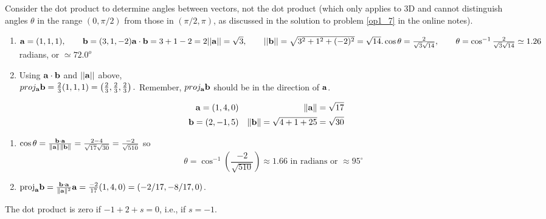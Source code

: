 \vspace{2mm}
Consider the dot product to determine angles between vectors, not the dot product (which only applies to 3D and cannot distinguish angles $\theta$ in the range $(0,\pi/2)$ from those in $(\pi/2,\pi)$, as discussed in the solution to problem \ref{op1_7} in the online notes).

\begin{enumerate}
\renewcommand{\labelenumi}{(\alph{enumi})}
\item $\aa = (1,1,1),\qquad \bb = (3,1,-2) \\ \aa\cdot\bb = 3+1-2 = 2\\
||\aa|| = \sqrt{3},\qquad ||\bb|| = \sqrt{3^2+1^2+(-2)^2}=\sqrt{14}.\\
\cos\theta = \frac{2}{\sqrt{3}\sqrt{14}},\qquad \theta = \cos^{-1}\frac{2}{\sqrt{3}\sqrt{14}}
\simeq 1.26 $ radians, or $\simeq 72.0^o$

\item Using $\aa\cdot\bb$ and $||\aa||$ above,\\
$proj_{\aa}\bb = \frac{2}{3}(1,1,1)=\left(\frac{2}{3},\frac{2}{3},\frac{2}{3}\right).$
Remember, $proj_{\aa}\bb$ should be in the direction of $\aa$.

\end{enumerate}

\vspace{2mm}
\begin{eqnarray*}
\aa = (1,4,0) & & \| \aa \| = \sqrt{17} \\
\bb = (2,-1,5) & & \| \bb \| = \sqrt{4 + 1 + 25} = \sqrt{30} 
\end{eqnarray*}
{\begin{enumerate}
\renewcommand{\labelenumi}{(\alph{enumi})}
\item $\cos \theta = \frac{\bb \cdot \aa}{\| \aa \| \| \bb \|} = 
   \frac{2-4}{\sqrt{17} \sqrt{30}} = \frac{-2}{\sqrt{510}}$ so
\[
\theta = \cos^{-1} \left( \frac{-2}{\sqrt{510}} \right) \approx 1.66 
\mbox{\ \ in radians or $\approx 95^\circ$}
\]
\item $\mbox{proj}_\aa \bb = \frac{\bb \cdot \aa}{\| \aa \|^2} \aa 
   = \frac{-2}{17} (1,4,0) = (-2/17, -8/17,0)$.
\end{enumerate}}

\vspace{2mm}
The dot product is zero if $-1+2+s=0$, i.e., if $s=-1$.

